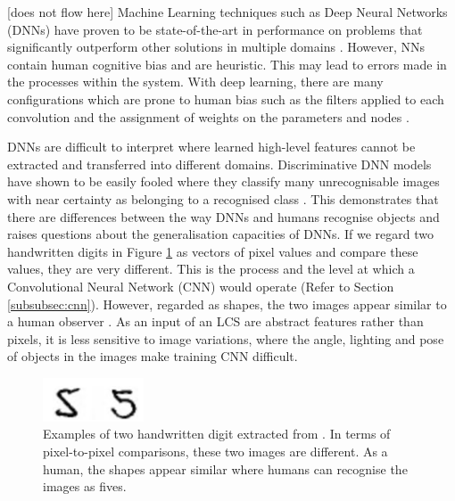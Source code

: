 [does not flow here]
 Machine Learning techniques such as Deep Neural Networks (DNNs) have proven to be state-of-the-art in performance on problems that significantly outperform other solutions in multiple domains \cite{lecun2015deep}. However, NNs contain human cognitive bias and are heuristic. This may lead to errors made in the processes within the system. With deep learning, there are many configurations which are prone to human bias such as the filters applied to each convolution and the assignment of weights on the parameters and nodes \cite{Cognitiv47}.

DNNs are difficult to interpret where learned high-level features cannot be extracted and transferred into different domains. Discriminative DNN models have shown to be easily fooled where they classify many unrecognisable images with near certainty as belonging to a recognised class \cite{nguyen2015deep}. This demonstrates that there are differences between the way DNNs and humans recognise objects and raises questions about the generalisation capacities of DNNs. If we regard two handwritten digits in Figure \ref{fig:similar5} as vectors of pixel values and compare these values, they are very different. This is the process and the level at which a Convolutional Neural Network (CNN) would operate (Refer to Section \ref{subsubsec:cnn}). However, regarded as shapes, the two images appear similar to a human observer \cite{belongie2002shape}. As an input of an LCS are abstract features rather than pixels, it is less sensitive to image variations, where the angle, lighting and pose of objects in the images make training CNN difficult. 

\begin{figure}[H]
	\begin{center}
		\includegraphics[width=30mm, scale=0.5]{similar5.png}
		\caption{Examples of two handwritten digit extracted from \cite{mnist}. In terms of pixel-to-pixel comparisons, these two images are different. As a human, the shapes appear similar where humans can recognise the images as fives.}
		\label{fig:similar5}
	\end{center}
\end{figure} 

